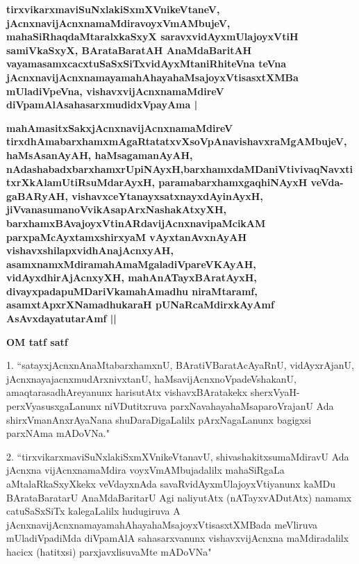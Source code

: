 \medskip
\textbf{tirxvikarxmaviSuNxlakiSxmXVnikeVtaneV, jAcnxnavijAcnxnamaMdiravoyxVmAMbujeV, mahaSiR\-haqdaMtaralxkaSxyX saravxvidAyxmUlajoyxVtiH samiVkaSxyX, BArataBaratAH AnaMdaBaritAH vayamasamxcacxtuSaSxSiTxvidAyxMtaniRhiteVna teVna jAcnxna\-vijAcnxnamayamahAhayahaMsajoyxVtisasxtXMBa mUladiVpeVna, vishavxvijAcnxnamaMdireV diVpa\-mAlAsahasarxmudidxVpayAma |}

\medskip
\textbf{
mahAmasitxSakxjAcnxnavijAcnxnamaMdireV tirxdhAmabarxhamxmAgaRtatatxvXsoVpAnavishavx\break\-raMgAMbujeV, haMsAsa\-nAyAH, haMsagamanAyAH, nAdashabadxbarxhamxrUpiNAyxH,\break barxhamxdaMDaniVtivivaqNavxtitxrXkAlamUtiRsuMdarAyxH, paramabarxhamxgaqhiNAyxH veVda-\break gaBARyAH, vishavxceYtanayxsatxnayxdAyinAyxH, jiVvanasumanoVvikAsapArxNashakAtxyXH, barxhamx\-BAvajoyxVtinARdavijAcnxnavipaMcikAM parxpaMcAyxtamxshirxyaM vAyxtanAvxnAyAH vishavx\break\-shilapxvidhAnajAcnxyAH, asamxnamxMdiramahAmaMgaladiVpareVKAyAH, vidAyxdhirAjAcnxyXH, mahAnATayxBAratAyxH, divayx\-pada\-puMDariVkamahAmadhu niraMtaramf, asamxtApxrXNamadhukaraH pUNaRcaMdirxkAyAmf AsAvxdayatutarAmf ||}

\begin{center}
{\bfseries{OM tatf satf}}
\end{center}

\newpage

\begin{artha}
1. ``satayxjAcnxnAnaMtabarxhamxnU, BAratiVBaratAcAyaRnU, vidAyxrAjanU, jAcnxna\-yajacnxmudArxnivxtanU, haMsavijAcnxnoVpadeVshakanU, amaqtarasadhAreyanunx harisutAtx vishavxBAratakekx sherxVyaH-perxVyasusxgaLanunx niVDu\-titxruva parxNavahayahaMsaparoVrajanU Ada shirxVmanAnxrAyaNana shuDaraDigaLalilx pArxNagaLanunx bagigxsi parxNAma mADoVNa."
\end{artha}

\begin{artha}
2. ``tirxvikarxmaviSuNxlakiSxmXVnikeVtanavU, shivashakitxsumaMdiravU Ada jAcnxna vijAcnxna\-maMdira voyxVmAMbujadalilx mahaSiRgaLa aMtalaRkaSxyXkekx veVdayxnAda savaRvidAyxmUlajoyxVtiyanunx kaMDu BArataBaratarU AnaMdaBaritarU Agi naliyutAtx (nATayx\-vADutAtx) namamx catuSaSxSiTx kalegaLalilx hudugiruva A jAcnxnavijAcnxna\-mayamahAhaya\-haMsajoyxVtisasxtXMBada meVliruva mUladiVpadiMda diVpamAlA sahasarxvanunx vishavx\-vijAcnxna\- maMdiradalilx hacicx (hatitxsi) parxjavxlisuvaMte mADoVNa"
\end{artha}

